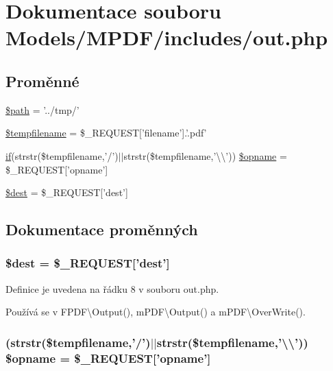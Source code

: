 \hypertarget{out_8php}{\section{Dokumentace souboru Models/\-M\-P\-D\-F/includes/out.php}
\label{out_8php}
}
\subsection*{Proměnné}
\begin{DoxyCompactItemize}
\item 
\hyperlink{out_8php_a0a4baf0b22973c07685c3981f0d17fc4}{\$path} = '../tmp/'
\item 
\hyperlink{out_8php_a14c690f54674f9d2fd0565f051179132}{\$tempfilename} = \$\-\_\-\-R\-E\-Q\-U\-E\-S\-T\mbox{[}'filename'\mbox{]}.'.pdf'
\item 
\hyperlink{pdf__parser_8php_af8105e84b42a9ceda5357caeb6c4760b}{if}(strstr(\$tempfilename,'/')$|$$|$strstr(\$tempfilename,'\textbackslash{}\textbackslash{}')) \hyperlink{out_8php_a64900c7a9afe1c7df510ed1745b33e6d}{\$opname} = \$\-\_\-\-R\-E\-Q\-U\-E\-S\-T\mbox{[}'opname'\mbox{]}
\item 
\hyperlink{out_8php_adf52eea47df263643f11e62249ab14e3}{\$dest} = \$\-\_\-\-R\-E\-Q\-U\-E\-S\-T\mbox{[}'dest'\mbox{]}
\end{DoxyCompactItemize}


\subsection{Dokumentace proměnných}
\hypertarget{out_8php_adf52eea47df263643f11e62249ab14e3}{
\subsubsection[{\$dest}]{\setlength{\rightskip}{0pt plus 5cm}\$dest = \$\-\_\-\-R\-E\-Q\-U\-E\-S\-T\mbox{[}'dest'\mbox{]}}}\label{out_8php_adf52eea47df263643f11e62249ab14e3}


Definice je uvedena na řádku 8 v souboru out.\-php.



Používá se v F\-P\-D\-F\textbackslash{}\-Output(), m\-P\-D\-F\textbackslash{}\-Output() a m\-P\-D\-F\textbackslash{}\-Over\-Write().

\hypertarget{out_8php_a64900c7a9afe1c7df510ed1745b33e6d}{
\subsubsection[{\$opname}]{ (strstr(\$tempfilename,'/')$|$$|$strstr(\$tempfilename,'\textbackslash{}\textbackslash{}')) \$opname = \$\-\_\-\-R\-E\-Q\-U\-E\-S\-T\mbox{[}'opname'\mbox{]}}}\label{out_8php_a64900c7a9afe1c7df510ed1745b33e6d}


